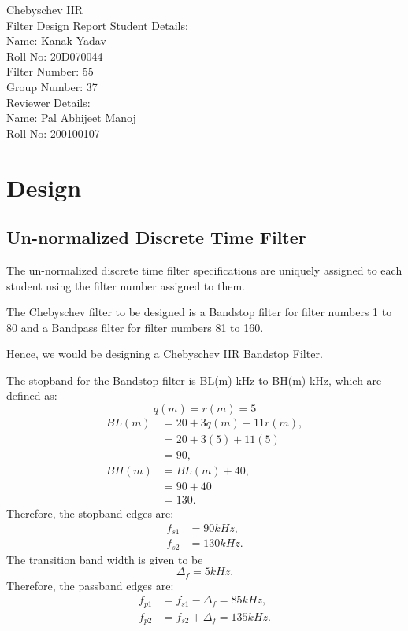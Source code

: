 \documentclass[12pt]{article}
\begin{document}
\begin{titlepage}
    \begin{center}
        \huge
        Chebyschev IIR\\Filter Design Report
        \vfill
        \large
        Student Details:\\\vspace{3pt}
        Name: Kanak Yadav\\\vspace{3pt}
        Roll No: 20D070044\\\vspace{3pt}
        Filter Number: 55\\\vspace{3pt}
        Group Number: 37\\\vspace{60pt}
        Reviewer Details:\\\vspace{3pt}
        Name: Pal Abhijeet Manoj\\\vspace{3pt}
        Roll No: 200100107
        \vfill
    \end{center}
\end{titlepage}

\section{Design}
\subsection{Un-normalized Discrete Time Filter}
The un-normalized discrete time filter specifications are uniquely assigned to each student using the filter number assigned to them.

The Chebyschev filter to be designed is a Bandstop filter for filter numbers 1 to 80 and a Bandpass filter for filter numbers 81 to 160.

Hence, we would be designing a Chebyschev IIR Bandstop Filter.

The stopband for the Bandstop filter is BL(m) kHz to BH(m) kHz, which are defined as:
\[q(m) = r(m) = 5\]
\begin{align*}
    BL(m) &= 20 + 3 q(m) + 11 r(m),\\
    &= 20 + 3(5) + 11(5)\\
    &= 90,\\
    BH(m) &= BL(m) + 40,\\
    &= 90 + 40\\
    &= 130.
\end{align*}
Therefore, the stopband edges are:
\begin{align*}
    f_{s1} &= 90 kHz,\\
    f_{s2} &= 130 kHz.
\end{align*}
The transition band width is given to be\[\Delta_f = 5 kHz.\]
Therefore, the passband edges are:
\begin{align*}
    f_{p1} &= f_{s1} - \Delta_f = 85 kHz,\\
    f_{p2} &= f_{s2} + \Delta_f = 135 kHz.
\end{align*}
\end{document}
